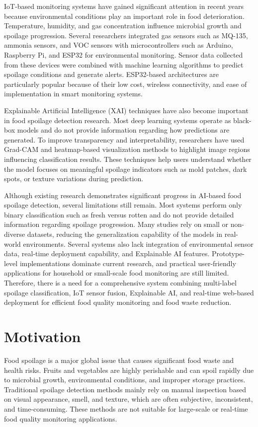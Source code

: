 IoT-based monitoring systems have gained significant attention in recent years because environmental conditions play an important role in food deterioration. Temperature, humidity, and gas concentration influence microbial growth and spoilage progression. Several researchers integrated gas sensors such as MQ-135, ammonia sensors, and VOC sensors with microcontrollers such as Arduino, Raspberry Pi, and ESP32 for environmental monitoring. Sensor data collected from these devices were combined with machine learning algorithms to predict spoilage conditions and generate alerts. ESP32-based architectures are particularly popular because of their low cost, wireless connectivity, and ease of implementation in smart monitoring systems.

Explainable Artificial Intelligence (XAI) techniques have also become important in food spoilage detection research. Most deep learning systems operate as black-box models and do not provide information regarding how predictions are generated. To improve transparency and interpretability, researchers have used Grad-CAM and heatmap-based visualization methods to highlight image regions influencing classification results. These techniques help users understand whether the model focuses on meaningful spoilage indicators such as mold patches, dark spots, or texture variations during prediction.

Although existing research demonstrates significant progress in AI-based food spoilage detection, several limitations still remain. Most systems perform only binary classification such as fresh versus rotten and do not provide detailed information regarding spoilage progression. Many studies rely on small or non-diverse datasets, reducing the generalization capability of the models in real-world environments. Several systems also lack integration of environmental sensor data, real-time deployment capability, and Explainable AI features. Prototype-level implementations dominate current research, and practical user-friendly applications for household or small-scale food monitoring are still limited. Therefore, there is a need for a comprehensive system combining multi-label spoilage classification, IoT sensor fusion, Explainable AI, and real-time web-based deployment for efficient food quality monitoring and food waste reduction.

\section[Motivation]{\textbf{Motivation}}
Food spoilage is a major global issue that causes significant food waste and health risks. Fruits and vegetables are highly perishable and can spoil rapidly due to microbial growth, environmental conditions, and improper storage practices. Traditional spoilage detection methods mainly rely on manual inspection based on visual appearance, smell, and texture, which are often subjective, inconsistent, and time-consuming. These methods are not suitable for large-scale or real-time food quality monitoring applications.

